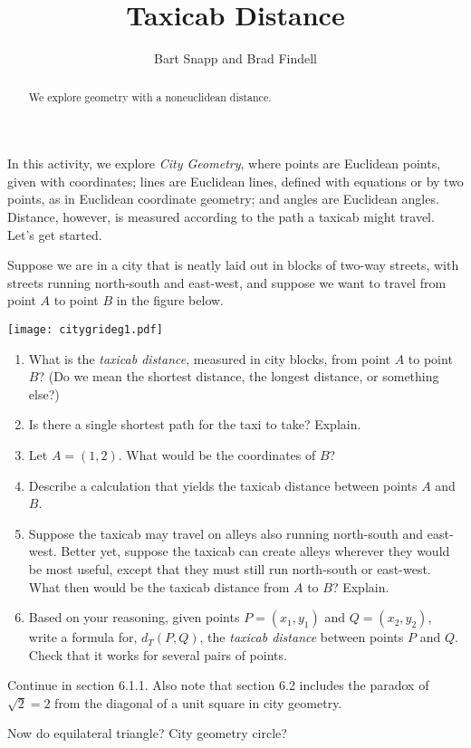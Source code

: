 \documentclass[nooutcomes]{ximera}
\title{Taxicab Distance}
\author{Bart Snapp and Brad Findell}
\begin{document}
\begin{abstract}
  We explore geometry with a noneuclidean distance.
\end{abstract}
\maketitle

In this activity, we explore \emph{City Geometry}, where points are Euclidean points, given with coordinates; lines are Euclidean lines, defined with equations or by two points, as in Euclidean coordinate geometry; and angles are Euclidean angles.  Distance, however, is measured according to the path a taxicab might travel.  Let's get started.  
\begin{problem}
Suppose we are in a city that is neatly laid out in blocks of two-way streets, with streets running north-south and east-west, and suppose we want to travel from point $A$ to point $B$ in the figure below.  
\begin{image}
\texttt{[image: citygrideg1.pdf]}
\end{image}
\begin{enumerate}
\item What is the \emph{taxicab distance}, measured in city blocks, from point $A$ to point $B$?  (Do we mean the shortest distance, the longest distance, or something else?)  
\vspace{0.5in}
\item Is there a single shortest path for the taxi to take?  Explain.  
\vspace{0.5in}
\item Let $A = (1,2)$. What would be the coordinates of $B$?  
\vspace{0.5in}
\item Describe a calculation that yields the taxicab distance between points $A$ and $B$.  
\vspace{0.5in}
\item Suppose the taxicab may travel on alleys also running north-south and east-west.  Better yet, suppose the taxicab can create alleys wherever they would be most useful, except that they must still run north-south or east-west.  What then would be the taxicab distance from $A$ to $B$?  Explain.  
\vspace{0.5in}
\item Based on your reasoning, given points $P = (x_1, y_1)$ and $Q= (x_2, y_2)$, write a formula for, $d_T(P,Q)$, the \emph{taxicab distance} between points $P$ and $Q$.  Check that it works for several pairs of points.  
\end{enumerate}
\vfill
\end{problem}

\begin{teachingnote}
Continue in section 6.1.1. Also note that section 6.2 includes the paradox of $\sqrt{2}=2$ from the diagonal of a unit square in city geometry.  

Now do equilateral triangle?  City geometry circle?
\end{teachingnote}
  
\end{document}
